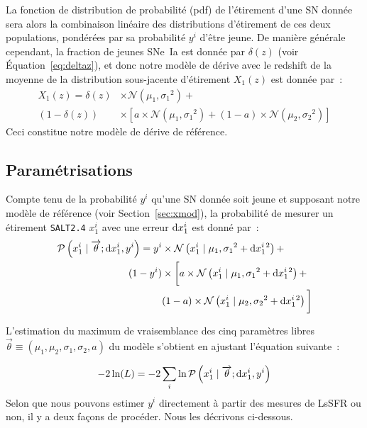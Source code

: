 \documentclass[../main/main.tex]{subfiles}
\begin{document}
La fonction de distribution de probabilité (pdf) de l'étirement d'une SN donnée
sera alors la combinaison linéaire des distributions d'étirement de ces deux
populations, pondérées par sa probabilité $y^i$ d'être jeune. De manière
générale cependant, la fraction de jeunes SNe~Ia est donnée par $\delta(z)$
(voir Équation~\ref{eq:deltaz}), et donc notre modèle de dérive avec le redshift
de la moyenne de la distribution sous-jacente d'étirement $X_1(z)$ est donnée
par~:
\begin{align}\label{eq:stretchz}
    X_1(z) = \delta(z)&\times \mathcal{N}(\mu_1,\sigma_1{}^2) + \nonumber \\
    (1-\delta(z))&\times \left[ a\times\mathcal{N}(\mu_1,\sigma_1{}^2) +
    (1-a)\times\mathcal{N}(\mu_2,\sigma_2{}^2) \right]
\end{align}
Ceci constitue notre modèle de dérive de référence.

\subsection{Paramétrisations}\label{ssec:pmod}

Compte tenu de la probabilité $y^i$ qu'une SN donnée soit jeune et supposant
notre modèle de référence (voir Section~\ref{sec:xmod}), la probabilité de
mesurer un étirement \texttt{SALT2.4} $x_1^i$ avec une erreur $\mathrm{d} x_1^i$ est
donné par~:
\begin{align}\label{eq:likelihoodsnf}
    \mathcal{P}\left(x^i_1 \mid \overrightarrow{\theta}; \mathrm{d}x^i_1, y^i\right) =
    y^i & \times
    \mathcal{N}\left(x^i_1 \mid \mu_1, \sigma_1{}^2+\mathrm{d}x^i_1{}^2\right) +
    \nonumber\\
    (1-y^i) &\times \bigg[
    a \times \mathcal{N}\left(x^i_1 \mid \mu_1,
    \sigma_1{}^2+\mathrm{d}x^i_1{}^2\right) +
    \nonumber\\
    & (1-a) \times \mathcal{N}\left(x^i_1 \mid \mu_2,
    \sigma_2{}^{2}+\mathrm{d}x^i_1{}^2\right) \bigg]
\end{align}

L'estimation du maximum de vraisemblance des cinq paramètres libres
$\overrightarrow{\theta}\equiv({\mu_1, \mu_2, \sigma_1, \sigma_2,a})$ du modèle
s'obtient en ajustant l'équation suivante~:

\begin{equation}\label{eq:likelihood}
    -2\ln(L) = -2 \sum_i \ln \mathcal{P}\left(x_1^i \mid \overrightarrow{\theta};
    \mathrm{d}x_1^i, y^i\right)
\end{equation}
Selon que nous pouvons estimer $y^i$ directement à partir des mesures de LsSFR
ou non, il y a deux façons de procéder. Nous les décrivons ci-dessous.
\end{document}
